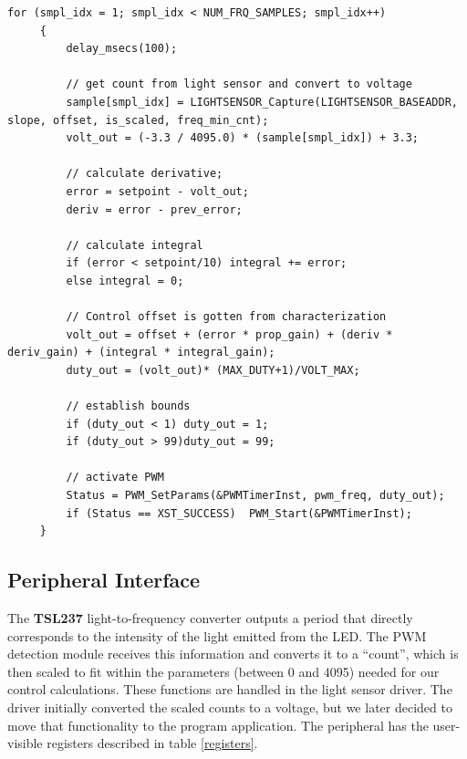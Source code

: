 \documentclass[11pt]{article}
\begin{document}
 \begin{lstlisting}[caption=PID Algorithm, label=PID]		
     for (smpl_idx = 1; smpl_idx < NUM_FRQ_SAMPLES; smpl_idx++)
     {
         delay_msecs(100);
 
         // get count from light sensor and convert to voltage 
         sample[smpl_idx] = LIGHTSENSOR_Capture(LIGHTSENSOR_BASEADDR, slope, offset, is_scaled, freq_min_cnt);
         volt_out = (-3.3 / 4095.0) * (sample[smpl_idx]) + 3.3;

         // calculate derivative;
         error = setpoint - volt_out;
         deriv = error - prev_error;
 
         // calculate integral
         if (error < setpoint/10) integral += error;
         else integral = 0; 
 
         // Control offset is gotten from characterization
         volt_out = offset + (error * prop_gain) + (deriv * deriv_gain) + (integral * integral_gain);
         duty_out = (volt_out)* (MAX_DUTY+1)/VOLT_MAX;
 
         // establish bounds
         if (duty_out < 1) duty_out = 1;
         if (duty_out > 99)duty_out = 99;
 
         // activate PWM
         Status = PWM_SetParams(&PWMTimerInst, pwm_freq, duty_out);
         if (Status == XST_SUCCESS)	 PWM_Start(&PWMTimerInst);
     } 
  \end{lstlisting}
  
  


\subsection{Peripheral Interface}
The \textbf{TSL237} light-to-frequency converter outputs a period that directly corresponds to the intensity of the light emitted from the LED.  The PWM detection module receives this information and converts it to a ``count'', which is then scaled to fit within the parameters (between 0 and 4095) needed for our control calculations.  These functions are handled in the light sensor driver.  The driver initially converted the scaled counts to a voltage, but we later decided to move that functionality to the program application.
The peripheral has the user-visible registers described in table \ref{registers}.
\end{document}
